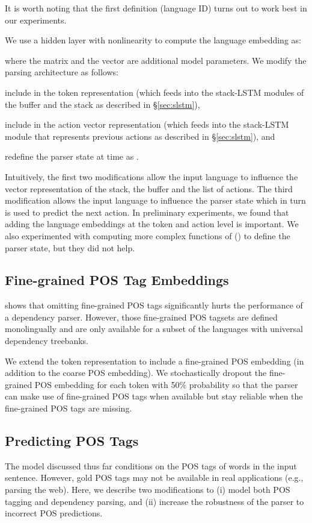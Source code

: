 \documentclass[11pt]{article}
\newenvironment{itemizesquish}{\begin{list}{\labelitemi}{\setlength{\itemsep}{0em}\setlength{\labelwidth}{0.5em}\setlength{\leftmargin}{\labelwidth}\addtolength{\leftmargin}{\labelsep}}}{\end{list}}
\begin{document}
It is worth noting that the first definition (language ID) turns out to work best in our experiments.

We use a hidden layer with  nonlinearity to compute the language embedding  as:

where the matrix  and the vector  are additional model parameters.
We modify the parsing architecture as follows:
\begin{itemizesquish}
\item include  in the token representation (which feeds into the stack-LSTM modules of the buffer and the stack as described in \S\ref{sec:slstm}),
\item include  in the action vector representation (which feeds into the stack-LSTM module that represents previous actions as described in \S\ref{sec:slstm}), and
\item redefine the parser state at time  as .
\end{itemizesquish}

Intuitively, the first two modifications allow the input language to influence the vector representation of the stack, the buffer and the list of actions.
The third modification allows the input language to influence the parser state which in turn is used to predict the next action.
In preliminary experiments, we found that adding the language embeddings at the token and action level is important.
We also experimented with computing more complex functions of () to define the parser state, but they did not help.

\subsection{Fine-grained POS Tag Embeddings}
\label{sec:fine_grained}
 shows that omitting fine-grained POS tags significantly hurts the performance of a dependency parser.
However, those fine-grained POS tagsets are defined monolingually and are only available for a subset of the languages with universal dependency treebanks.

We extend the token representation to include a fine-grained POS embedding (in addition to the coarse POS embedding).
We stochastically dropout the fine-grained POS embedding for each token with 50\% probability \cite{srivastava:14} so that the parser can make use of fine-grained POS tags when available but stay reliable when the fine-grained POS tags are missing.

\subsection{Predicting POS Tags}
\label{sec:joint}
The model discussed thus far conditions on the POS tags of words in the input sentence.
However, gold POS tags may not be available in real applications (e.g., parsing the web).
Here, we describe two modifications to (i) model both POS tagging and dependency parsing, and (ii) increase the robustness of the parser to incorrect POS predictions.
\end{document}

